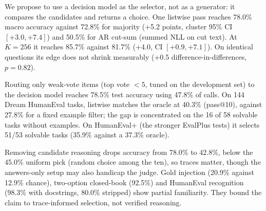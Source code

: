 We propose to use a decision model as the selector, not as a generator: it compares the candidates and returns a choice. One listwise pass reaches 78.0\% macro accuracy against 72.8\% for majority (+5.2 points, cluster 95\% CI $[+3.0,+7.4]$) and 50.5\% for AR cut-sum (summed NLL on cut text). At $K=256$ it reaches 85.7\% against 81.7\% (+4.0, CI $[+0.9,+7.1]$). On identical questions its edge does not shrink measurably (+0.5 difference-in-differences, $p=0.82$).

Routing only weak-vote items (top vote $<5$, tuned on the development set) to the decision model reaches 78.5\% test accuracy using 47.8\% of calls. On 144 Dream HumanEval tasks, listwise matches the oracle at 40.3\% (pass@10), against 27.8\% for a fixed example filter; the gap is concentrated on the 16 of 58 solvable tasks without examples. On HumanEval+ (the stronger EvalPlus tests) it selects 51/53 solvable tasks (35.9\% against a 37.3\% oracle).

Removing candidate reasoning drops accuracy from 78.0\% to 42.8\%, below the 45.0\% uniform pick (random choice among the ten), so traces matter, though the answers-only setup may also handicap the judge. Gold injection (20.9\% against 12.9\% chance), two-option closed-book (92.5\%) and HumanEval recognition (98.3\% with docstrings, 80.0\% stripped) show partial familiarity. They bound the claim to trace-informed selection, not verified reasoning.
